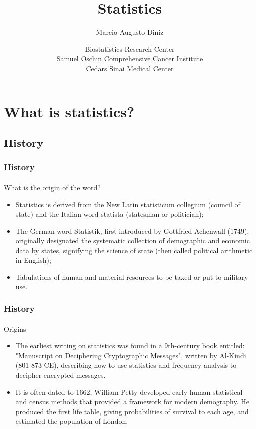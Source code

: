 \documentclass[10pt]{beamer}
\title{Statistics}
\author[marcio.diniz@cshs.org]{Marcio Augusto Diniz}
\date[\today]
{Biostatistics Research Center\\
Samuel Oschin Comprehensive Cancer Institute\\
Cedars Sinai Medical Center}
\begin{document}
\maketitle

\section{What is statistics?}

\subsection{History}

\begin{frame}
\frametitle{History}
\framesubtitle{}
\begin{block}{What is the origin of the word?}
\begin{itemize}
\item<1-> Statistics  is derived from the New Latin statisticum collegium (council of state) and the Italian word statista (statesman or politician);
\item<1-> The German word Statistik, first introduced by Gottfried Achenwall (1749), originally designated the systematic collection of demographic and economic data by states, signifying the science of state (then called political arithmetic in English); 
\item<2-> Tabulations of human and material resources to be taxed or put to military use.
\end{itemize}
\end{block}
\end{frame}

\begin{frame}
\frametitle{History}
\framesubtitle{}
\begin{block}{Origins}
\begin{itemize}
\item<1-> The earliest writing on statistics was found in a 9th-century book entitled: "Manuscript on Deciphering Cryptographic Messages", written by Al-Kindi (801-873 CE), describing how to use statistics and frequency analysis to decipher encrypted messages. 
\item<2-> It is often dated to 1662,  William Petty developed early human statistical and census methods that provided a framework for modern demography. He produced the first life table, giving probabilities of survival to each age, and estimated the population of London. 
\end{itemize}
\end{block}
\end{frame}
\end{document}
